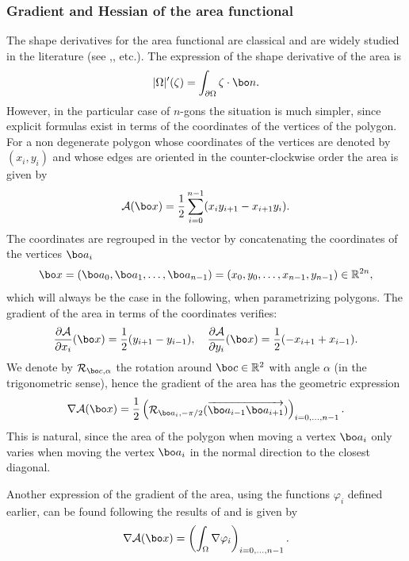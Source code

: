 \subsubsection*{Gradient and Hessian of the area functional} The shape derivatives for the area functional are classical and are widely studied in the literature (see \cite{henrot-pierre-english},\cite{laurain2ndDeriv}, etc.). The expression of the shape derivative of the area is
\begin{equation}
|\Omega|'(\zeta) = \int_{\partial\Omega} \zeta \cdot \bo n.
\label{eq:sh-deriv-area}
\end{equation} However, in the particular case of $n$-gons the situation is much simpler, since explicit formulas exist in terms of the coordinates of the vertices of the polygon. For a non degenerate polygon whose coordinates of the vertices are denoted by $(x_i,y_i)$ and whose edges are oriented in the counter-clockwise order the area is given by
\[
\mathcal A(\bo x) = \frac{1}{2} \sum_{i=0}^{n-1} (x_iy_{i+1}-x_{i+1}y_i).
\]
The coordinates are regrouped in the vector by concatenating the coordinates of the vertices $\bo a_i$
\begin{equation}
\bo x = (\bo a_0,\bo a_1,\dots,\bo a_{n-1}) = (x_0,y_0,\dots,x_{n-1},y_{n-1})\in \Bbb{R}^{2n},
\label{eq:coordinates}
\end{equation}
which will always be the case in the following, when parametrizing polygons.
The gradient of the area in terms of the coordinates verifies:
\[
\frac{\partial \mathcal A}{\partial x_i}(\bo x) = \frac{1}{2}(y_{i+1}-y_{i-1}), \quad
\frac{\partial \mathcal A}{\partial y_i}(\bo x) = \frac{1}{2}(-x_{i+1}+x_{i-1}).
\]
We denote by $\mathcal R_{\bo c,\alpha}$ the rotation around $\bo c \in \Bbb{R}^2$ with angle $\alpha$ (in the trigonometric sense), hence the gradient of the area has the geometric expression
\begin{equation}
\nabla \mathcal A(\bo x) = \frac{1}{2}\begin{pmatrix}
\mathcal R_{\bo a_i,-\pi/2}(\overrightarrow{\bo a_{i-1}\bo a_{i+1}})
\end{pmatrix}_{i=0,\dots,n-1}.
\label{eq:grad-area}
\end{equation}
This is natural, since the area of the polygon when moving a vertex $\bo a_i$ only varies when moving the vertex $\bo a_i$ in the normal direction to the closest diagonal.

Another expression of the gradient of the area, using the functions $\varphi_i$ defined earlier, can be found following the results of \cite{laurain2ndDeriv} and is given by
\begin{equation}
\nabla \mathcal A(\bo x) = \left(\int_\Omega \nabla \varphi_i\right)_{i=0,\dots,n-1}.
\label{eq:grad-area-phi}
\end{equation}

